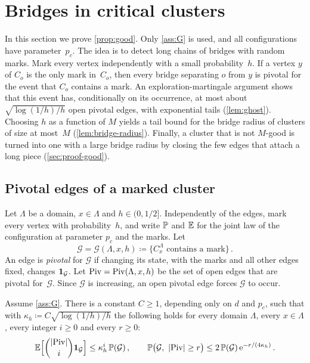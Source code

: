 \section{Bridges in critical clusters}\label{sec:bridges}

In this section we prove \cref{prop:good}. Only \cref{ass:G} is used, and all configurations have
parameter~$p_c$. The idea is to detect long chains of bridges with random marks. Mark every vertex
independently with a small probability~$h$. If a vertex $y$ of $C_o$ is the only mark in~$C_o$, then
every bridge separating $o$ from $y$ is pivotal for the event that $C_o$ contains a mark. An
exploration-martingale argument shows that this event has, conditionally on its occurrence, at most
about $\sqrt{\log(1/h)/h}$ open pivotal edges, with exponential tails (\cref{lem:ghost}). Choosing $h$
as a function of $M$ yields a tail bound for the bridge radius of clusters of size at most~$M$
(\cref{lem:bridge-radius}). Finally, a cluster that is not $M$-good is turned into one with a large
bridge radius by closing the few edges that attach a long piece (\cref{sec:proof-good}).

\subsection{Pivotal edges of a marked cluster}\label{sec:ghost}

Let $\Lambda$ be a domain, $x\in\Lambda$ and $h\in(0,1/2]$. Independently of the edges, mark every
vertex with probability~$h$, and write $\mathbb P$ and $\mathbb E$ for the joint law of the configuration at
parameter $p_c$ and the marks. Let
\begin{equation*}
  \mathcal G=\mathcal G(\Lambda,x,h)\coloneqq\{C_x^\Lambda\text{ contains a mark}\}\,.
\end{equation*}
An edge is \emph{pivotal} for $\mathcal G$ if changing its state, with the marks and all other edges
fixed, changes $\mathbf{1}_{\mathcal G}$. Let $\operatorname{Piv}=\operatorname{Piv}(\Lambda,x,h)$ be the set of open edges that are
pivotal for~$\mathcal G$. Since $\mathcal G$ is increasing, an open pivotal edge forces $\mathcal G$ to
occur.

\begin{lemma}\label{lem:ghost}
Assume \cref{ass:G}. There is a constant $C\ge1$, depending only on $d$ and $p_c$, such that with
$\kappa_h\coloneqq C\sqrt{\log(1/h)/h}$ the following holds for every domain $\Lambda$, every
$x\in\Lambda$, every integer $i\ge0$ and every $r\ge0$:
\begin{equation}\label{eq:ghost}
  \mathbb E\Bigl[\binom{\lvert\operatorname{Piv}\rvert}{i}\mathbf{1}_{\mathcal G}\Bigr]\le\kappa_h^i\,\mathbb P(\mathcal G)\,,\qquad
  \mathbb P\bigl(\mathcal G,\ \lvert\operatorname{Piv}\rvert\ge r\bigr)\le2\,\mathbb P(\mathcal G)\,\mathrm{e}^{-r/(4\kappa_h)}\,.
\end{equation}
\end{lemma}


